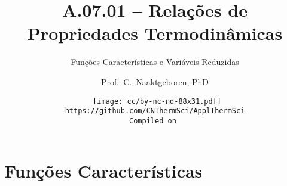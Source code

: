 \makeatletter
\immediate{} %
\makeatother



\title{A.07.01 -- Relações de Propriedades Termodinâmicas}
\subtitle{Funções Características e Variáveis Reduzidas}
\author{Prof.~C.~Naaktgeboren, PhD}
\date{{\scriptsize\tt%
    \texttt{[image: cc/by-nc-nd-88x31.pdf]}\\[\smallskipamount]
    https://github.com/CNThermSci/ApplThermSci\\
    Compiled on 
}}

\frame{\titlepage}

\frame{\tableofcontents}

\section{Funções Características}

